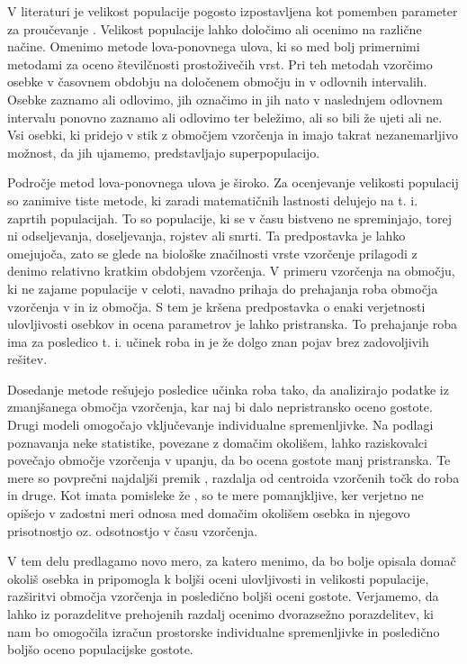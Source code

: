 V literaturi je velikost populacije pogosto izpostavljena kot pomemben parameter za proučevanje \citep{kindberg_estimating_2011, chandler_spatially_2013, jimenez_spatial_2017, moqanaki_counting_2018}. Velikost populacije lahko določimo ali ocenimo na različne načine. Omenimo metode lova-ponovnega ulova, ki so med bolj primernimi metodami za oceno številčnosti prostoživečih vrst. Pri teh metodah vzorčimo osebke v časovnem obdobju na določenem območju in v odlovnih intervalih. Osebke zaznamo ali odlovimo, jih označimo in jih nato v naslednjem odlovnem intervalu ponovno zaznamo ali odlovimo ter beležimo, ali so bili že ujeti ali ne. Vsi osebki, ki pridejo v stik z območjem vzorčenja in imajo takrat nezanemarljivo možnost, da jih ujamemo, predstavljajo superpopulacijo.

Področje metod lova-ponovnega ulova je široko. Za ocenjevanje velikosti populacij so zanimive tiste metode, ki zaradi matematičnih lastnosti delujejo na t. i. zaprtih populacijah. To so populacije, ki se v času bistveno ne spreminjajo, torej ni odseljevanja, doseljevanja, rojstev ali smrti. Ta predpostavka je lahko omejujoča, zato se glede na biološke značilnosti vrste vzorčenje prilagodi z denimo relativno kratkim obdobjem vzorčenja. V primeru vzorčenja na območju, ki ne zajame populacije v celoti, navadno prihaja do prehajanja roba območja vzorčenja v in iz območja. S tem je kršena predpostavka o enaki verjetnosti ulovljivosti osebkov in ocena parametrov je lahko pristranska. To prehajanje roba ima za posledico t. i. učinek roba in je že dolgo znan pojav brez zadovoljivih rešitev.

Dosedanje metode rešujejo posledice učinka roba tako, da analizirajo podatke iz zmanjšanega območja vzorčenja, kar naj bi dalo nepristransko oceno gostote. Drugi modeli omogočajo vključevanje individualne spremenljivke. Na podlagi poznavanja neke statistike, povezane z domačim okolišem, lahko raziskovalci povečajo območje vzorčenja v upanju, da bo ocena gostote manj pristranska. Te mere so povprečni najdaljši premik \citep{wilson_evaluation_1985}, razdalja od centroida vzorčenih točk do roba \citep{whittington_comparison_2015} in druge. Kot imata pomisleke že \citet{whittington_comparison_2015}, so te mere pomanjkljive, ker verjetno ne opišejo v zadostni meri odnosa med domačim okolišem osebka in njegovo prisotnostjo oz. odsotnostjo v času vzorčenja.

V tem delu predlagamo novo mero, za katero menimo, da bo bolje opisala domač okoliš osebka in pripomogla k boljši oceni ulovljivosti in velikosti populacije, razširitvi območja vzorčenja in posledično boljši oceni gostote. Verjamemo, da lahko iz porazdelitve prehojenih razdalj ocenimo dvorazsežno porazdelitev, ki nam bo omogočila izračun prostorske individualne spremenljivke in posledično boljšo oceno populacijske gostote.

